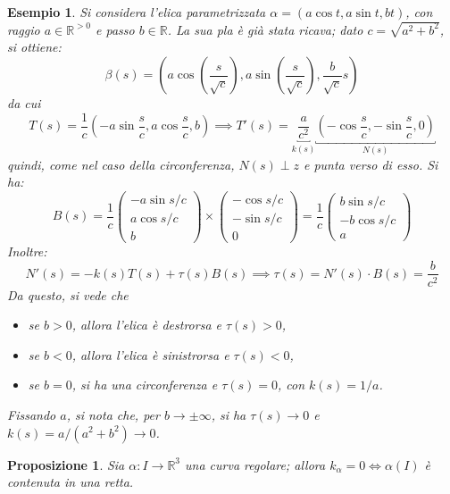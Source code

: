 \documentclass[12pt]{article}
\theoremstyle{style}
\newtheorem{esempio}{Esempio}[section]
\newtheorem{prop}{Proposizione}[section]
\numberwithin{equation}{subsection}
\begin{document}
\begin{esempio}
Si considera l'elica parametrizzata $\alpha = (a\cos t , a \sin t, bt)$, con raggio $a\in \mathbb{R}^{>0} $ e passo $b \in \mathbb{R}$.
La sua pla \`e gi\`a stata ricava; dato $c = \sqrt{a^2 + b^2} $, si ottiene:
\[
	\beta (s)= \left(a \cos \left(\frac{s}{\sqrt{c} }\right) , a\sin \left(\frac{s}{\sqrt{c} }\right),\frac{b}{\sqrt{c} } s\right)
\] 
da cui
\[
	T(s) = \frac{1}{c}\left(-a \sin \frac{s}{c}, a \cos \frac{s}{c}, b\right) \implies T'(s) = \underbracket{\frac{a}{c^2}}_{k(s)} \underbracket{\left(-\cos \frac{s}{c},- \sin \frac{s}{c},0\right) }_{N(s)} 
\] 
quindi, come nel caso della circonferenza, $N(s)\perp z$ e punta verso di esso.
Si ha:
\[
B(s) = \frac{1}{c} \begin{pmatrix} - a \sin s / c\\ a \cos s / c\\ b  \end{pmatrix} \times \begin{pmatrix} - \cos s / c \\ - \sin s / c \\ 0  \end{pmatrix} = \frac{1}{c} \begin{pmatrix} b \sin s / c \\ - b \cos  s / c \\ a  \end{pmatrix} 
\] 
Inoltre:
\[
	N'(s) = - k(s) T(s) +\tau (s) B(s) \implies \tau (s) = N'(s) \cdot B(s) =  \frac{b}{c^2}
\] 
Da questo, si vede che
\begin{itemize}
	\item se $b>0$, allora l'elica \`e destrorsa e $\tau (s) >0$,
	\item se $b<0$, allora l'elica \`e sinistrorsa e $\tau (s) < 0 $,
	\item se $b=0$, si ha una circonferenza e $\tau (s) = 0 $, con $k(s) = 1 / a$.
\end{itemize}
Fissando $a$, si nota che, per $b \to \pm \infty$, si ha $\tau (s) \to 0$ e $k(s) = a / (a^2 + b^2) \to 0 $.
\end{esempio}
\begin{prop}
	Sia $\alpha  : I \to \mathbb{R}^3$ una curva regolare; allora $k_\alpha = 0 \iff \alpha (I)$ \`e contenuta in una retta.
\end{prop}
\end{document}
